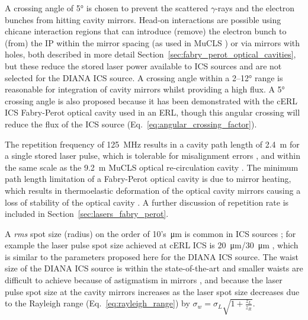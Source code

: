 \documentclass[../main.tex]{subfiles}
\begin{document}
A crossing angle of 5\si{\degree} is chosen to prevent the scattered $\gamma$-rays and the electron bunches from hitting cavity mirrors. Head-on interactions are possible using chicane interaction regions  that can introduce (remove) the electron bunch to (from) the IP within the mirror spacing (as used in MuCLS \cite{eggl2016munich}) or via mirrors with holes, both described in more detail Section~\ref{sec:fabry_perot_optical_cavities}, but these reduce the stored laser power available to ICS sources and are not selected for the DIANA ICS source. A crossing angle within a 2--12\si{\degree} range is reasonable for integration of cavity mirrors \cite{variola2011luminosity} whilst providing a high flux. A 5\si{\degree} crossing angle is also proposed because it has been demonstrated with the cERL ICS \cite{akagi2016narrow} Fabry-Perot optical cavity used in an ERL, though this angular crossing will reduce the flux of the ICS source (Eq.~\ref{eq:angular_crossing_factor}). 

The repetition frequency of 125~\si{\mega\hertz} results in a cavity path length of 2.4~\si{\meter} for a single stored laser pulse, which is tolerable for misalignment errors \cite{zomer2009polarization}, and within the same scale as the 9.2~\si{\meter} MuCLS optical re-circulation cavity \cite{eggl2016munich}. The minimum path length limitation of a Fabry-Perot optical cavity is due to mirror heating, which results in thermoelastic deformation of the optical cavity mirrors causing a loss of stability of the optical cavity \cite{chaikovska2016high}. A further discussion of repetition rate is included in Section~\ref{sec:lasers_fabry_perot}.   

A \textit{rms} spot size (radius) on the order of 10's~\si{\micro\meter} is common in ICS sources \cite{deitrick2017inverse,drebot2019brixs,dupraz2020thomx}; for example the laser pulse spot size achieved at cERL ICS is 20~\si{\micro\meter}/30~\si{\micro\meter} \cite{akagi2016narrow}, which is similar to the parameters proposed here for the DIANA ICS source. The waist size of the DIANA ICS source is within the state-of-the-art and smaller waists are difficult to achieve because of astigmatism in mirrors \cite{zomer2009polarization}, and because the laser pulse spot size at the cavity mirrors increases as the laser spot size decreases due to the Rayleigh range (Eq.~\ref{eq:rayleigh_range}) by $\sigma_{w} = \sigma_{L}\sqrt{1+\frac{z_{L}}{z_{R}}}$.
\end{document}
